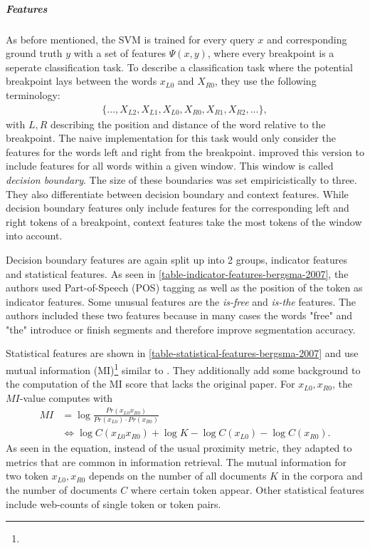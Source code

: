 \subparagraph*{\textbf{Features}}
As before mentioned, the SVM is trained for every query $x$ and corresponding ground truth $y$ with a set of features $\Psi(x,y)$, where every breakpoint is a seperate classification task. To describe a classification task where the potential breakpoint lays between the words $x_{L0}$ and $X_{R0}$, they use the following terminology:
\begin{align*}
\{..., X_{L2}, X_{L1}, X_{L0}, X_{R0}, X_{R1}, X_{R2},...\},
\end{align*}
with $L,R$ describing the position and distance of the word relative to the breakpoint.
The naive implementation for this task would only consider the features for the words left and right from the breakpoint. \citeauthor{Bergsma:2007} improved this version to include features for all words within a given window. This window is called \textit{decision boundary}. The size of these boundaries was set empiricistically to three.
They also differentiate between decision boundary and context features. While decision boundary features only include features for the corresponding left and right tokens of a breakpoint, context features take the most tokens of the window into account.



Decision boundary features are again split up into 2 groups, indicator features and statistical features. As seen in \ref{table-indicator-features-bergsma-2007}, the authors used Part-of-Speech (POS) tagging as well as the position of the token as indicator features. Some unusual features are the \textit{is-free} and \textit{is-the} features. The authors included these two features because in many cases the words "free" and "the" introduce or finish segments and therefore improve segmentation accuracy.



Statistical features are shown in \ref{table-statistical-features-bergsma-2007} and use mutual information (MI)\footnote{} similar to \citeauthor{Risvik:2003}. They additionally add some background to the computation of the MI score that lacks the original paper. For $x_{L0},x_{R0}$, the $MI$-value computes with
\begin{align*}
MI &= \log \frac{Pr(x_{L0}x_{R0})}{Pr(x_{L0}) \cdot Pr(x_{R0})} \\
&\Leftrightarrow \log C(x_{L0}x_{R0}) + \log K - \log C(x_{L0}) - \log C(x_{R0}).
\end{align*}
As seen in the equation, instead of the usual proximity metric, they adapted to metrics that are common in information retrieval. The mutual information for two token $x_{L0},x_{R0}$ depends on the number of all documents $K$ in the corpora and the number of documents $C$ where certain token appear.
Other statistical features include web-counts of single token or token pairs.

